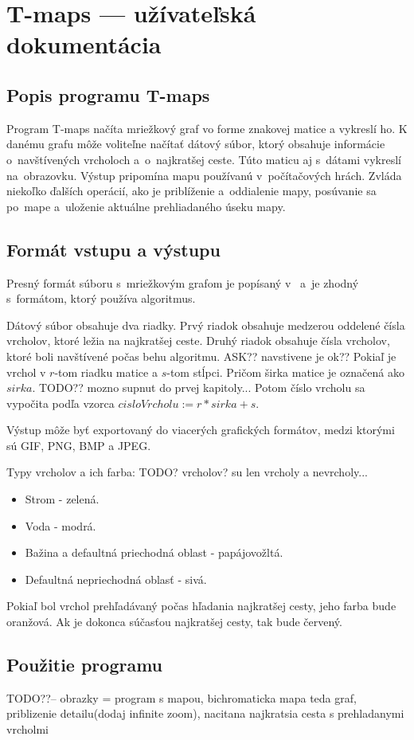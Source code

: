 \chapter{T-maps --- užívateľská dokumentácia}
\label{userdoc}
\section{Popis programu T-maps}
Program T-maps načíta mriežkový graf vo forme znakovej matice a vykreslí ho. K danému grafu môže voliteľne načítať dátový súbor, ktorý obsahuje
informácie o~navštívených vrcholoch a~o~najkratšej ceste.
Túto maticu aj s~dátami vykreslí na~obrazovku. Výstup pripomína mapu používanú v~počítačových hrách.
Zvláda niekoľko ďalších operácií, ako je priblíženie a~oddialenie mapy, posúvanie sa po~mape a~uloženie aktuálne prehliadaného úseku mapy.


\section{Formát vstupu a výstupu}
Presný formát súboru s~mriežkovým grafom je popísaný v~\cite{sturtevant2012benchmarks} a~je zhodný s~formátom, 
ktorý používa algoritmus.

Dátový súbor obsahuje dva riadky. Prvý riadok obsahuje medzerou oddelené čísla vrcholov, ktoré ležia na najkratšej ceste.
Druhý riadok obsahuje čísla vrcholov, ktoré boli navštívené počas behu algoritmu. ASK?? navstivene je ok??
Pokiaľ je vrchol v $r$-tom riadku matice a $s$-tom stĺpci. Pričom širka matice je označená ako $sirka$. TODO?? mozno supnut do prvej kapitoly...
 Potom číslo vrcholu sa vypočita podľa vzorca $cisloVrcholu := r*sirka + s$. 

Výstup môže byť exportovaný do viacerých grafických formátov, medzi ktorými sú GIF, PNG, BMP a JPEG.



Typy vrcholov a ich farba: TODO? vrcholov? su len vrcholy a nevrcholy...
\begin{itemize}
\item Strom - zelená.
\item Voda - modrá.
\item Bažina a defaultná priechodná oblast - papájovožltá.
\item Defaultná nepriechodná oblasť - sivá.

\end{itemize}

Pokiaľ bol vrchol prehľadávaný počas hľadania najkratšej cesty, jeho farba bude oranžová. Ak je dokonca súčasťou najkratšej cesty, 
tak bude červený.

\section{Použitie programu}

TODO??-- obrazky = program s mapou, bichromaticka mapa teda graf, priblizenie detailu(dodaj infinite zoom), nacitana najkratsia cesta s prehladanymi vrcholmi
